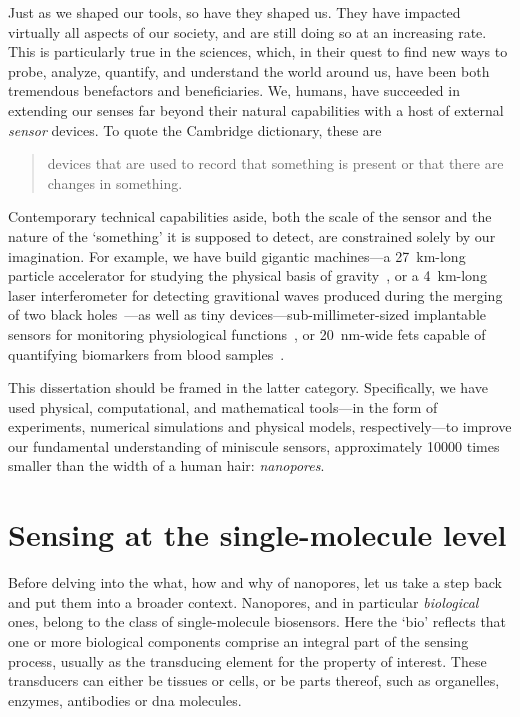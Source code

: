 Just as we shaped our tools, so have they shaped us. They have impacted virtually all aspects of our society,
and are still doing so at an increasing rate. This is particularly true in the sciences, which, in their quest
to find new ways to probe, analyze, quantify, and understand the world around us, have been both tremendous
benefactors and beneficiaries. We, humans, have succeeded in extending our senses far beyond their natural
capabilities with a host of external \emph{sensor} devices. To quote the Cambridge dictionary, these are
%
\begin{quote}
  devices that are used to record that something is present or that there are changes in something.
\end{quote}
%
Contemporary technical capabilities aside, both the scale of the sensor and the nature of the `something' it
is supposed to detect, are constrained solely by our imagination. For example, we have build gigantic
machines---a \SI{27}{\kilo\meter}-long particle accelerator for studying the physical basis of
gravity~\cite{ATLAS-2012}, or a \SI{4}{\kilo\meter}-long laser interferometer for detecting gravitional waves
produced during the merging of two black holes~\cite{Abbott-2016}---as well as tiny
devices---sub-millimeter-sized implantable sensors for monitoring physiological functions~\cite{Dong-2019}, or
\SI{20}{\nm}-wide \glspl{fet} capable of quantifying biomarkers from blood samples~\cite{Krivitsky-2016}.

This dissertation should be framed in the latter category. Specifically, we have used physical, computational,
and mathematical tools---in the form of experiments, numerical simulations and physical models,
respectively---to improve our fundamental understanding of miniscule sensors, approximately \num{10000} times
smaller than the width of a human hair: \emph{nanopores}.


%
%
\section{Sensing at the single-molecule level}
%

Before delving into the what, how and why of nanopores, let us take a step back and put them into a broader
context. Nanopores, and in particular \emph{biological} ones, belong to the class of single-molecule
biosensors. Here the `bio' reflects that one or more biological components comprise an integral part of the
sensing process, usually as the transducing element for the property of interest. These transducers can either
be tissues or cells, or be parts thereof, such as organelles, enzymes, antibodies or \gls{dna} molecules.

